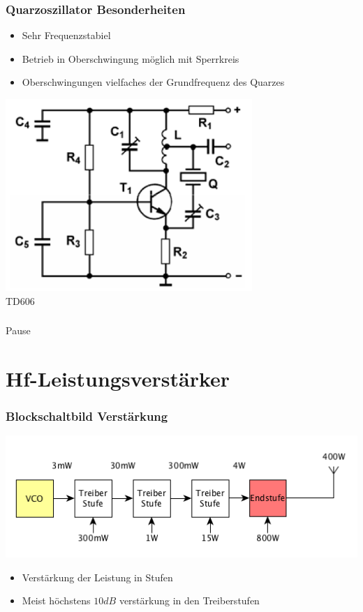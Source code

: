 \begin{frame}
    \frametitle{Quarzoszillator Besonderheiten}
    \large
         \begin{itemize}
			\item Sehr Frequenzstabiel
			\item Betrieb in Oberschwingung möglich mit Sperrkreis
			\item Oberschwingungen vielfaches der Grundfrequenz des Quarzes
    	\end{itemize}    
            \includegraphics[width=0.7\textwidth]{a07/TD606_quarz_Oberschwingung.png}\\
            \tiny TD606 \hyperlink{refs}{\cite{bna}}
\end{frame}

\begin{frame}
    \frametitle{ }
            \begin{center}
         \Huge Pause
                 \end{center}
\end{frame}

\section*{Hf-Leistungsverstärker}

\begin{frame}
    \frametitle{Blockschaltbild Verstärkung}
    \begin{center}
        \includegraphics[width=1\textwidth]{a07/paBsb.png} \large
     	\begin{itemize}
			\item Verstärkung der Leistung in Stufen
			\item Meist höchstens $10dB$ verstärkung in den Treiberstufen
    	\end{itemize}
    \end{center}
\end{frame}

